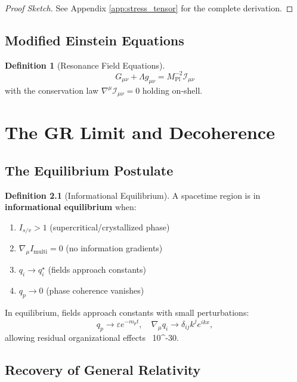 \documentclass[openany]{memoir}
\theoremstyle{definition}
\newtheorem{definition}{Definition}[chapter]
\theoremstyle{plain}
\theoremstyle{remark}
\newcommand{\Imulti}{I_{\text{multi}}}
\newcommand{\Isv}{I_{s/v}}
\newcommand{\MPl}{M_{\text{Pl}}}
\begin{document}
\begin{proof}[Proof Sketch]
See Appendix \ref{app:stress_tensor} for the complete derivation.
\end{proof}

\section{Modified Einstein Equations}

\begin{definition}[Resonance Field Equations]
\begin{equation}
\boxed{G_{\mu\nu} + \Lambda g_{\mu\nu} = \MPl^{-2} \mathcal{I}_{\mu\nu}}
\end{equation}
with the conservation law $\nabla^\mu \mathcal{I}_{\mu\nu} = 0$ holding on-shell.
\end{definition}

\chapter{The GR Limit and Decoherence}

\section{The Equilibrium Postulate}

\begin{definition}[Informational Equilibrium]
A spacetime region is in \textbf{informational equilibrium} when:
\begin{enumerate}
\item $\Isv > 1$ (supercritical/crystallized phase)
\item $\nabla_\mu \Imulti = 0$ (no information gradients)
\item $q_i \to q_i^\star$ (fields approach constants)
\item $q_p \to 0$ (phase coherence vanishes)
\end{enumerate}
In equilibrium, fields approach constants with small perturbations:
\begin{equation}
q_p \to \varepsilon e^{-m_p t}, \quad \nabla_\mu q_i \to \delta_{ij} k^j e^{ikx},
\end{equation}
allowing residual organizational effects ~10^{-30}.
\end{definition}

\section{Recovery of General Relativity}
\end{document}
